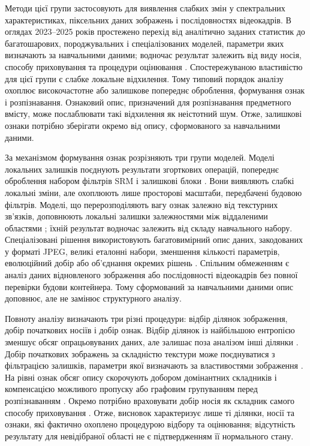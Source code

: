 Методи цієї групи застосовують для виявлення слабких змін у спектральних характеристиках, піксельних даних зображень і послідовностях відеокадрів. В оглядах 2023--2025 років простежено перехід від аналітично заданих статистик до багатошарових, породжувальних і спеціалізованих моделей, параметри яких визначають за навчальними даними; водночас результат залежить від виду носія, способу приховування та процедури оцінювання \cite{rustad2023survey,wani2023review,luo2024survey,michaylov2025forensic}. Спостережуваною властивістю для цієї групи є слабке локальне відхилення. Тому типовий порядок аналізу охоплює високочастотне або залишкове попереднє оброблення, формування ознак і розпізнавання. Ознаковий опис, призначений для розпізнавання предметного вмісту, може послаблювати такі відхилення як неістотний шум. Отже, залишкові ознаки потрібно зберігати окремо від опису, сформованого за навчальними даними.

За механізмом формування ознак розрізняють три групи моделей. Моделі локальних залишків поєднують результати згорткових операцій, попереднє оброблення набором фільтрів SRM і залишкові блоки \cite{fu2022ccnet,bravoortiz2024cvtstegonet,ntivuguruzwa2023cnn}. Вони виявляють слабкі локальні зміни, але охоплюють лише просторові масштаби, передбачені будовою фільтрів. Моделі, що перерозподіляють вагу ознак залежно від текстурних зв’язків, доповнюють локальні залишки залежностями між віддаленими областями \cite{xie2023selfattention,zhou2024texturetransformer}; їхній результат водночас залежить від складу навчального набору. Спеціалізовані рішення використовують багатовимірний опис даних, закодованих у форматі JPEG, великі еталонні набори, зменшення кількості параметрів, еволюційний добір або об’єднання окремих рішень \cite{xu2025jpegmap,gao2025recognition,huang2024sasrnet,ma2025evolutionary,swarnkar2024fusion}. Спільним обмеженням є аналіз даних відновленого зображення або послідовності відеокадрів без повної перевірки будови контейнера. Тому сформований за навчальними даними опис доповнює, але не замінює структурного аналізу.

Повноту аналізу визначають три різні процедури: відбір ділянок зображення, добір початкових носіїв і добір ознак. Відбір ділянок із найбільшою ентропією зменшує обсяг опрацьовуваних даних, але залишає поза аналізом інші ділянки \cite{agarwal2024entropy}. Добір початкових зображень за складністю текстури може поєднуватися з фільтрацією залишків, параметри якої визначають за властивостями зображення \cite{ma2023coverselection}. На рівні ознак обсяг опису скорочують добором домінантних складників і компенсацією можливого пропуску \cite{yu2024dominantfeatures} або графовим групуванням перед розпізнаванням \cite{dehdar2023graph}. Окремо потрібно враховувати добір носія як складник самого способу приховування \cite{azame2025coverselection}. Отже, висновок характеризує лише ті ділянки, носії та ознаки, які фактично охоплено процедурою відбору та оцінювання; відсутність результату для невідібраної області не є підтвердженням її нормального стану.

